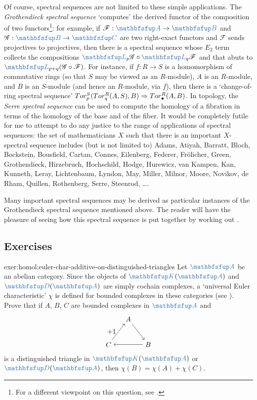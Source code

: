 Of course, spectral sequences are not limited to these simple
applications. The \emph{Grothendieck spectral sequence} `computes' the
derived functor of the composition of two functors\footnote{For a
  different viewpoint on this question, see .}:
for example, if $\mathscr{F} : \categ{A} \to \categ{B}$ and
$\mathscr{G} : \categ{B} \to \categ{C}$ are two right-exact functors
and $\mathscr{F}$ sends projectives to projectives, then there is a
spectral sequence whose $E_2$ term collects the compositions
$\categ{L}_p\mathscr{G} \circ \categ{L}_q\mathscr{F}$ and that abuts
to $\categ{L}_{p+q}(\mathscr{G} \circ \mathscr{F})$.  For instance, if
$f : R \to S$ is a homomorphism of commutative rings (so that $S$ may
be viewed as an $R$-module), $A$ is an $R$-module, and $B$ is an
$S$-module (and hence an $R$-module, via $f$), then there is a
`change-of-ring spectral sequence'
$Tor^S_p(Tor^R_q(A,S),B) \Rightarrow Tor^R_\bullet(A,B)$. In
topology, the \emph{Serre spectral sequence} can be used to compute
the homology of a fibration in terms of the homology of the base and
of the fiber. It would be completely futile for me to attempt to do
any justice to the range of applications of spectral sequences: the
set of mathematicians $X$ such that there is an important $X$-spectral
sequence includes (but is not limited to) Adams, Atiyah, Barratt,
Bloch, Bockstein, Bousfield, Cartan, Connes, Eilenberg, Federer,
Fr\"olicher, Green, Grothendieck, Hirzebruch, Hochschild, Hodge,
Hurewicz, van Kampen, Kan, Kunneth, Leray, Lichtenbaum, Lyndon, May,
Miller, Milnor, Moore, Novikov, de Rham, Quillen, Rothenberg, Serre,
Steenrod, \dots.

Many important spectral sequences may be derived as particular
instances of the Grothendieck spectral sequence mentioned above. The
reader will have the pleasure of seeing how this spectral sequence is
put together by working out
.

\subsection*{Exercises}

\begin{exer}{}{exer:homol:euler-char-additive-on-distinguished-triangles}
  Let $\categ{A}$ be an abelian category. Since the objects of
  $\categ{K}(\categ{A})$ and $\categ{D}(\categ{A})$ are simply cochain
  complexes, a `universal Euler characteristic' $\chi$ is defined for
  bounded complexes in these categories (see
  ). Prove
  that if $A$, $B$, $C$ are bounded complexes in $\categ{A}$ and
  \[
    \begin{tikzpicture}[baseline=(current bounding box.center)]
      \node (A) at (1,1.3) {$A$}; \node (C) at (0,0)
      {$C$}; \node (B) at (2,0)
      {$B$}; \draw[->] (A) -- (B); \draw[->] (B) -- (C); \draw[->] (C)
      -- (A) node[midway, left] {$+1$};
    \end{tikzpicture}
  \]
  is a distinguished triangle in $\categ{K}(\categ{A})$ or
  $\categ{D}(\categ{A})$, then $\chi(B) = \chi(A) + \chi(C)$.
\end{exer}

